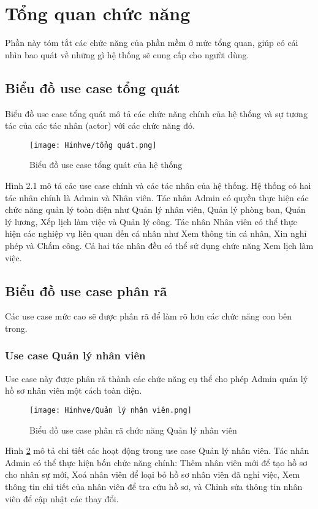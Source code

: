 \documentclass[../DoAn.tex]{subfiles}
\begin{document}
\section{Tổng quan chức năng}
\label{section:2.2}
Phần này tóm tắt các chức năng của phần mềm ở mức tổng quan, giúp có cái nhìn bao quát về những gì hệ thống sẽ cung cấp cho người dùng.

\subsection{Biểu đồ use case tổng quát}
\label{subsection:2.2.1}
Biểu đồ use case tổng quát mô tả các chức năng chính của hệ thống và sự tương tác của các tác nhân (actor) với các chức năng đó.\begin{figure}[H]
    \centering
    \texttt{[image: Hinhve/tổng quát.png]}
    \caption{Biểu đồ use case tổng quát của hệ thống}
    \label{fig:uc_tong_quat}
\end{figure}
Hình 2.1 mô tả các use case chính và các tác nhân của hệ thống. Hệ thống có hai tác nhân chính là Admin và Nhân viên. Tác nhân Admin có quyền thực hiện các chức năng quản lý toàn diện như Quản lý nhân viên, Quản lý phòng ban, Quản lý lương, Xếp lịch làm việc và Quản lý công. Tác nhân Nhân viên có thể thực hiện các nghiệp vụ liên quan đến cá nhân như Xem thông tin cá nhân, Xin nghỉ phép và Chấm công. Cả hai tác nhân đều có thể sử dụng chức năng Xem lịch làm việc.

\subsection{Biểu đồ use case phân rã}
\label{subsection:2.2.2}
Các use case mức cao sẽ được phân rã để làm rõ hơn các chức năng con bên trong.

\subsubsection{Use case Quản lý nhân viên}
Use case này được phân rã thành các chức năng cụ thể cho phép Admin quản lý hồ sơ nhân viên một cách toàn diện.

\begin{figure}[H]
    \centering
    \texttt{[image: Hinhve/Quản lý nhân viên.png]}
    \caption{Biểu đồ use case phân rã chức năng Quản lý nhân viên}
    \label{fig:uc_ql_nhanvien}
\end{figure}
Hình \ref{fig:uc_ql_nhanvien} mô tả chi tiết các hoạt động trong use case Quản lý nhân viên. Tác nhân Admin có thể thực hiện bốn chức năng chính: Thêm nhân viên mới để tạo hồ sơ cho nhân sự mới, Xoá nhân viên để loại bỏ hồ sơ nhân viên đã nghỉ việc, Xem thông tin chi tiết của nhân viên để tra cứu hồ sơ, và Chỉnh sửa thông tin nhân viên để cập nhật các thay đổi.
\end{document}
